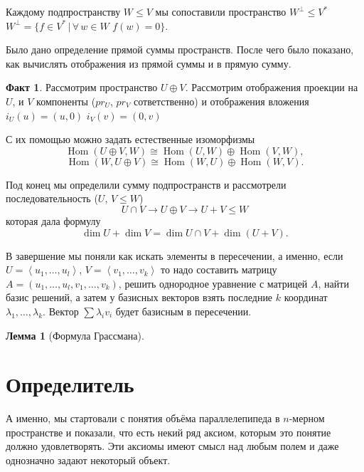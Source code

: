 \documentclass[10pt,a4paper,oneside]{book}
\theoremstyle{definition}
\newtheorem*{fact}{Факт}
\newtheorem{lem}{Лемма}
\newcommand{\Hom}{\operatorname{Hom}}
\def\lan{\left\langle }
\def\ran{\right\rangle}
\def\lm{\begin{lem}}
\def\elm{\end{lem}}
\begin{document}
Каждому подпространству $W\leq V$ мы сопоставили пространство $W^{\bot}\leq V^{*}$  $W^{\bot}=\{f\in V^{*}\,|\, \forall\, w\in W\,\, f(w)=0\}$.

Было дано определение прямой суммы пространств. После чего было показано, как вычислять отображения из прямой суммы и в прямую сумму.

\begin{fact}
Рассмотрим пространство $U\oplus V$. Рассмотрим отображения проекции на $U$, и $V$ компоненты ($pr_U$, $pr_V$ сответственно) и отображения вложения $i_U(u)=(u,0)$ $i_V(v)=(0,v)$

\begin{center}
\end{center}


С их помощью можно задать естественные изоморфизмы
$$\Hom(U\oplus V, W)\cong \Hom(U,W)\oplus \Hom(V,W),$$
$$\Hom(W, U\oplus V)\cong \Hom(W,U)\oplus \Hom(W,V).$$
\end{fact}

Под конец мы определили сумму подпространств и рассмотрели последовательность ($U$, $V\leq W$)
$$U\cap V \to U\oplus V \to U+V \leq W$$
которая дала формулу
$$\dim U +\dim V = \dim U\cap V + \dim (U+V).$$

В завершение мы поняли как искать элементы в пересечении, а именно, если $U=\lan u_1,\dots, u_l \ran$, $V=\lan v_1, \dots, v_k\ran$ то надо составить матрицу $A=(u_1, \dots, u_l, v_1, \dots, v_k)$, решить однородное уравнение с матрицей $A$, найти базис решений, а затем у базисных векторов взять последние $k$ координат  $\lambda_1,\dots, \lambda_k $. Вектор $\sum \lambda_i v_i$ будет базисным в пересечении.



\lm[Формула Грассмана]
\elm


\section{Определитель}

А именно, мы стартовали с понятия объёма параллелепипеда в $n$-мерном пространстве и показали, что есть некий ряд аксиом, которым это понятие должно удовлетворять. Эти аксиомы имеют смысл над любым полем и даже однозначно задают некоторый объект. 
\end{document}
